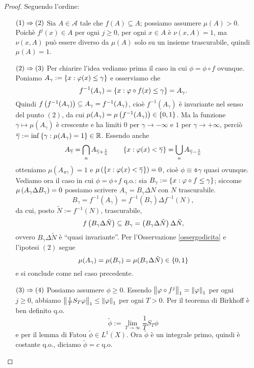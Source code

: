 \begin{proof} Seguendo l'ordine:\begin{itemize}
    \item[$(1)\Rightarrow(2)$] Sia $A\in\mathcal{A}$ tale che $f(A)\subseteq A$; possiamo assumere $\mu(A)>0$. Poichè $f^j(x)\in A$ per ogni $j\ge 0$, per ogni $x\in A$
	    è $\nu(x,A)=1$, ma $\nu(x,A)$ può essere diverso da $\mu(A)$ solo su un insieme trascurabile, quindi $\mu(A)=1$.
    \item[$(2)\Rightarrow(3)$] Per chiarire l'idea vediamo prima il caso in cui $\phi=\phi\circ f$ ovunque.
	    Poniamo $A_\gamma:=\left\{x:\varphi(x)\le\gamma\right\}$ e osserviamo che
	    \[ f^{-1}(A_\gamma)=\left\{x:\varphi\circ f(x)\le\gamma\right\}=A_\gamma. \]
	    Quindi $f\left(f^{-1}(A_\gamma)\right)\subseteq A_\gamma=f^{-1}(A_\gamma)$, cioè $f^{-1}(A_\gamma)$ è invariante nel senso del punto $(2)$,
	    da cui $\mu(A_\gamma)=\mu\left(f^{-1}(A_\gamma)\right)\in\left\{0,1\right\}$.
	    Ma la funzione $\gamma\mapsto\mu(A_\gamma)$ è crescente e ha limiti $0$ per $\gamma\to -\infty$ e $1$ per $\gamma\to +\infty$,
	    perciò $\overline{\gamma}:=\inf\left\{\gamma:\mu(A_\gamma)=1\right\}\in\mathbb{R}$. Essendo anche 
	    \[A_{\overline{\gamma}}=\bigcap_n A_{\overline{\gamma}+\frac{1}{n}} \qquad \left\{x:\varphi(x)<\overline{\gamma}\right\}=\bigcup_n A_{\overline{\gamma}-\frac{1}{n}}\]
	    otteniamo $\mu(A_{\obar{\gamma}})=1$
	    e $\mu\left(\left\{x:\varphi(x)<\overline{\gamma}\right\}\right)=0$, cioè $\phi\equiv\obar{\gamma}$ quasi ovunque. 
	    Vediamo ora il caso in cui $\phi=\phi\circ f$ q.o.: sia $B_\gamma:=\left\{x:\varphi\circ f\le\gamma\right\}$;
	    siccome $\mu\left(A_\gamma\Delta B_\gamma\right)=0$ possiamo scrivere $A_\gamma=B_\gamma\Delta N$ con $N$ trascurabile.
	    \[B_\gamma=f^{-1}(A_\gamma)=f^{-1}(B_\gamma)\Delta f^{-1}(N),\]
	    da cui, posto $\tilde{N}:=f^{-1}(N)$, trascurabile,
	    \[f\left(B_\gamma\Delta\tilde{N}\right)\subseteq B_\gamma=\left(B_\gamma\Delta\tilde{N}\right)\Delta\tilde{N},\]
	    ovvero $B_\gamma\Delta\tilde{N}$ è ``quasi invariante''. Per l'Osservazione \ref{ossergodicita} e l'ipotesi $(2)$ segue
	    \[\mu(A_\gamma)=\mu(B_\gamma)=\mu(B_\gamma\Delta\tilde{N})\in\left\{0,1\right\}\]
	    e si conclude come nel caso precedente.
    \item[$(3)\Rightarrow (4)$] Possiamo assumere $\phi\ge 0$.
	    Essendo $\left\|\varphi\circ f^j\right\|_1=\left\|\varphi\right\|_1$ per ogni $j\ge 0$, abbiamo $\left\|\frac{1}{T}S_T\varphi\right\|_1\le \left\|\varphi\right\|_1$ per ogni $T>0$.
	    Per il teorema di Birkhoff è ben definito q.o. 
	    \[\tilde{\phi}:=\lim_{T\to\infty}\frac{1}{T}S_T\phi\]
	    e per il lemma di Fatou $\tilde{\phi}\in L^1(X)$. Ora $\tilde{\phi}$ è un integrale primo, quindi è costante q.o., diciamo $\tilde{\phi}=c$ q.o. 

\end{itemize}
\end{proof}
